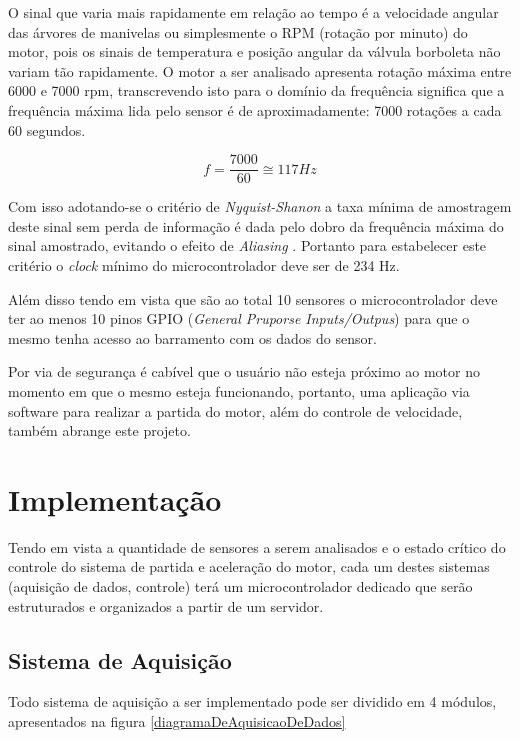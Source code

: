 O sinal que varia mais rapidamente em relação ao tempo é a velocidade angular das árvores de manivelas ou simplesmente o RPM (rotação por minuto) do motor, pois os sinais de temperatura e posição angular da válvula borboleta não variam tão rapidamente. O motor a ser analisado apresenta rotação máxima entre 6000 e 7000 rpm, transcrevendo isto para o domínio da frequência significa que a frequência máxima lida pelo sensor é de aproximadamente: 7000 rotações a cada 60 segundos.

\begin{equation}
	f = \frac{7000}{60} \cong 117 Hz	
\end{equation}

Com isso adotando-se o critério de \textit{Nyquist-Shanon} \cite{diniz2014processamento} a taxa mínima de amostragem deste sinal sem perda de informação é dada pelo dobro da frequência máxima do sinal amostrado, evitando o efeito de \textit{Aliasing} \cite{diniz2014processamento}. Portanto para estabelecer este critério o \textit{clock} mínimo do microcontrolador deve ser de 234 Hz.

Além disso tendo em vista que são ao total 10 sensores o microcontrolador deve ter ao menos 10 pinos GPIO (\textit {General Pruporse Inputs/Outpus}) para que o mesmo tenha acesso ao barramento com os dados do sensor. 

Por via de segurança é cabível que o usuário não esteja próximo ao motor no momento em que o mesmo esteja funcionando, portanto, uma aplicação via software para realizar a partida do motor, além do controle de velocidade, também abrange este projeto.

\section{Implementação}

Tendo em vista a quantidade de sensores a serem analisados e o estado crítico do controle do sistema de partida e aceleração do motor, cada um destes sistemas (aquisição de dados, controle) terá um microcontrolador dedicado que serão estruturados e organizados a partir de um servidor.

\subsection{Sistema de Aquisição}

Todo sistema de aquisição a ser implementado pode ser dividido em 4 módulos, apresentados na figura \ref{diagramaDeAquisicaoDeDados}

